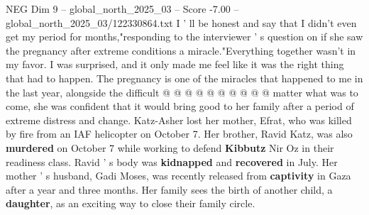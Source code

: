 \begin{textsample}{NEG Dim 9 – global\_north\_2025\_03 – Score -7.00 – global\_north\_2025\_03/122330864.txt}
I ' ll be honest and say that I didn't even get my period for months,"responding to the interviewer ' s question on if she saw the pregnancy after extreme conditions a miracle."Everything together wasn't in my favor.
I was surprised, and it only made me feel like it was the right thing that had to happen.
The pregnancy is one of the miracles that happened to me in the last year, alongside the difficult @ @ @ @ @ @ @ @ @ @ matter what was to come, she was confident that it would bring good to her family after a period of extreme distress and change.
Katz-Asher lost her mother, Efrat, who was killed by fire from an IAF helicopter on October 7.
Her brother, Ravid Katz, was also \textbf{murdered} on October 7 while working to defend \textbf{Kibbutz} Nir Oz in their readiness class.
Ravid ' s body was \textbf{kidnapped} and \textbf{recovered} in July.
Her mother ' s husband, Gadi Moses, was recently released from \textbf{captivity} in Gaza after a year and three months.
Her family sees the birth of another child, a \textbf{daughter}, as an exciting way to close their family circle.

\end{textsample}
